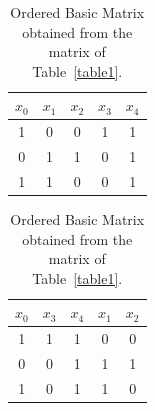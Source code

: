 \documentclass[authoryear,preprint,review,12pt]{elsarticle}
\begin{document}
\begin{table}[!htb]
\begin{minipage}{.5\linewidth}
\caption{Basic Matrix for the example.}\label{table1}
\centering
\begin{tabular}{ ccccc }
\hline
$x_0$ & $x_1$ & $x_2$ & $x_3$ & $x_4$ \\
\hline
1 & 0 & 0 & 1 & 1 \\
0 & 1 & 1 & 0 & 1 \\
1 & 1 & 0 & 0 & 1 \\
\hline
\end{tabular}
\end{minipage}%
\begin{minipage}{.5\linewidth}
\centering
\caption{Ordered Basic Matrix obtained from the matrix of Table~\ref{table1}.}\label{table2}
\begin{tabular}{ ccccc }
\hline
$x_0$ & $x_3$ & $x_4$ & $x_1$ & $x_2$ \\
\hline
1 & 1 & 1 & 0 & 0 \\
0 & 0 & 1 & 1 & 1 \\
1 & 0 & 1 & 1 & 0 \\
\hline
\end{tabular}
\end{minipage}
\end{table}

\newcommand{\lcell}[2][2in]{$\vcenter{\hsize#1\baselineskip11pt\vspace*{2.5pt}\raggedright#2\strut}$}
\end{document}
